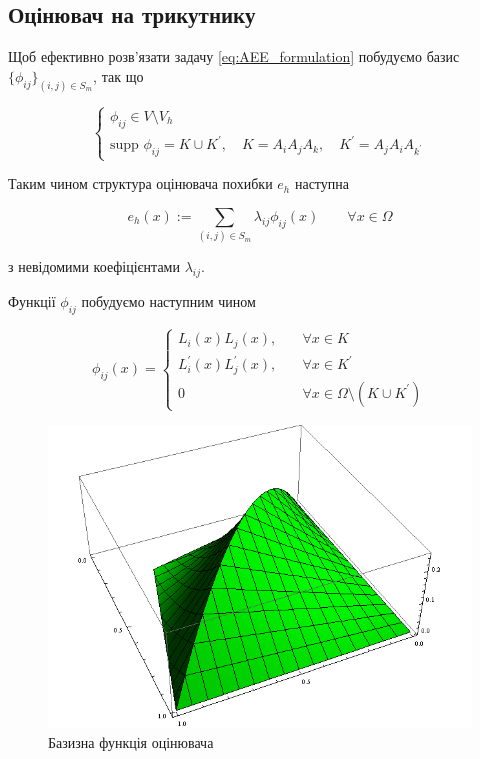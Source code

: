 
\subsection{Оцінювач на трикутнику}

Щоб ефективно розв'язати задачу
\eqref{eq:AEE_formulation} побудуємо базис $\lbrace \phi_{ij} \rbrace_{(i,j) \in S_m}$, так що

\begin{equation}\label{eq:basis_properties}
\begin{cases}
	\phi_{ij} \in V \setminus V_h \\
	\text{supp } \phi_{ij} = K \cup K^\prime, \quad K = A_iA_jA_k, \quad K^\prime = A_jA_iA_{k^\prime}
\end{cases}
\end{equation}

Таким чином структура оцінювача похибки $e_h$ наступна

\begin{equation}
	e_h(x) := \sum \limits_{(i,j) \in S_m} \lambda_{ij} \phi_{ij}(x) \qquad \forall x \in \Omega
\end{equation}

з невідомими коефіцієнтами $\lambda_{ij}$.

Функції $\phi_{ij}$ побудуємо наступним чином

\begin{equation}
	\phi_{ij}(x) =
	\begin{cases}
		L_i(x)L_j(x), &\quad \forall x \in K\\
		L_i^\prime(x)L_j^\prime(x), &\quad \forall x \in K^\prime\\
		0 &\quad \forall x \in \Omega \setminus (K \cup K^\prime)
	\end{cases}
\end{equation}

\begin{figure}[H]
	\centering
    \includegraphics[scale=0.7]{images/basis}
    \caption{Базизна функція оцінювача}
    \label{fig:AEE_basis}
\end{figure}

